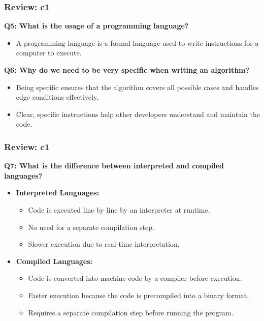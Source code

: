 \documentclass[
	11pt, %
]{beamer}
\begin{document}
\begin{frame}
	\frametitle{Review: c1}

	\textbf{Q5: What is the usage of a programming language?}

	\begin{itemize}
	    \item A programming language is a formal language used to write instructions for a computer to execute.
	\end{itemize}

	\vspace{0.5cm}

	\textbf{Q6: Why do we need to be very specific when writing an algorithm?}

	\begin{itemize}
	    \item Being specific ensures that the algorithm covers all possible cases and handles edge conditions effectively.
	    \item Clear, specific instructions help other developers understand and maintain the code.
	\end{itemize}

\end{frame}



\begin{frame}
	\frametitle{Review: c1}

    \label{slide:q7}

\textbf{Q7: What is the difference between interpreted and compiled languages?}
	\begin{itemize}
	    \item \textbf{Interpreted Languages:}
	    \begin{itemize}
	        \item Code is executed line by line by an interpreter at runtime.
	        \item No need for a separate compilation step.
	        \item Slower execution due to real-time interpretation.
	    \end{itemize}
	    
	    \item \textbf{Compiled Languages:}
	    \begin{itemize}
	        \item Code is converted into machine code by a compiler before execution.
	        \item Faster execution because the code is precompiled into a binary format.
	        \item Requires a separate compilation step before running the program.
	    \end{itemize}
	\end{itemize}


\end{frame}
\end{document}
